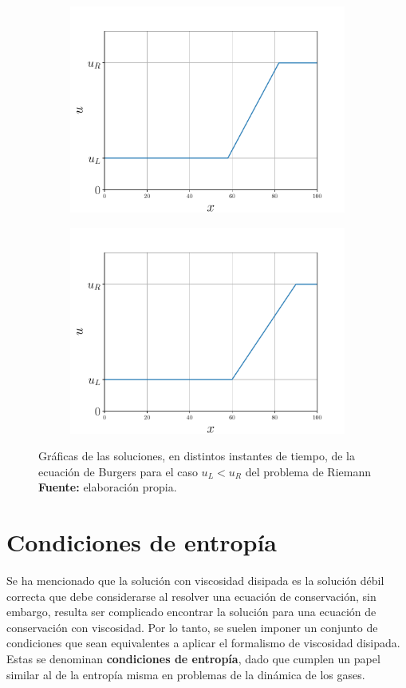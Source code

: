 \begin{figure}[ht]
\begin{subfigure}{0.5\textwidth}
		\includegraphics[width=\linewidth]{../some_plots/cap1/graficas/riemannRL-0.8.pdf}
	\end{subfigure}
	\begin{subfigure}{0.5\textwidth}
		\centering
		\includegraphics[width=\linewidth]{../some_plots/cap1/graficas/riemannRL-1.pdf}
	\end{subfigure}
	\caption{Gráficas de las soluciones, en distintos instantes de tiempo, de la ecuación de Burgers para el caso $u_L < u_R$ del problema de Riemann \textbf{Fuente:} elaboración propia.}
	\label{fig:rarefaccion}
\end{figure}
\section{Condiciones de entropía}
Se ha mencionado que la solución con viscosidad disipada es la solución débil correcta que debe considerarse al resolver una ecuación de conservación, sin embargo, resulta ser complicado encontrar la solución para una ecuación de conservación con viscosidad. Por lo tanto, se suelen imponer un conjunto de condiciones que sean equivalentes a aplicar el formalismo de viscosidad disipada. Estas se denominan \textbf{condiciones de entropía}, dado que cumplen un papel similar al de la entropía misma en problemas de la dinámica de los gases.

